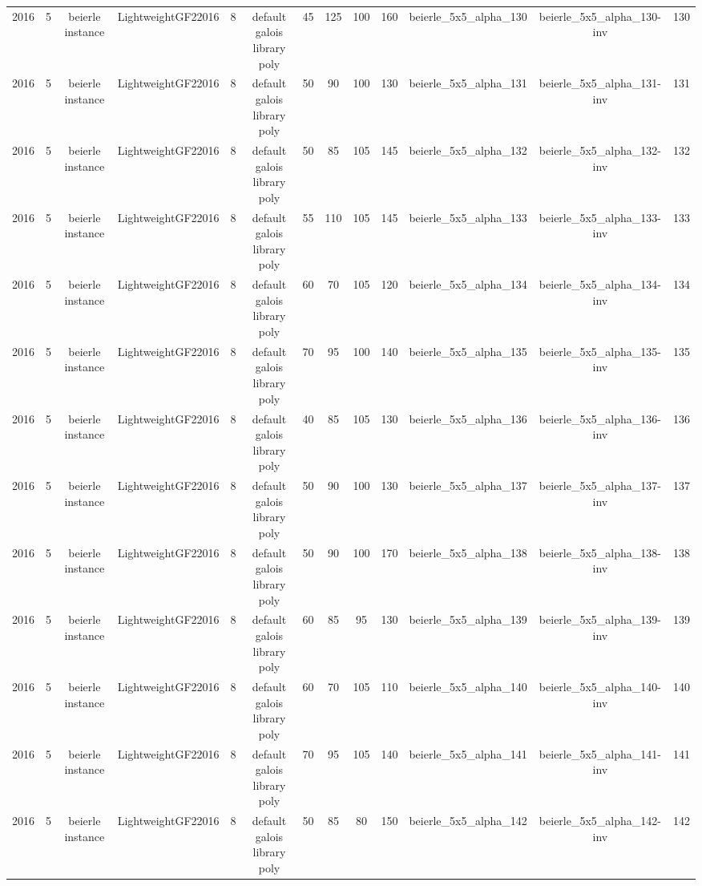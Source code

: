 \begin{tabular}{c c c c c c c c c c c c c}
2016 & 5 & beierle instance & LightweightGF22016 & 8 & default galois library poly & 45 & 125 & 100 & 160 & beierle_5x5_alpha_130 & beierle_5x5_alpha_130-inv & 130 \\
2016 & 5 & beierle instance & LightweightGF22016 & 8 & default galois library poly & 50 & 90 & 100 & 130 & beierle_5x5_alpha_131 & beierle_5x5_alpha_131-inv & 131 \\
2016 & 5 & beierle instance & LightweightGF22016 & 8 & default galois library poly & 50 & 85 & 105 & 145 & beierle_5x5_alpha_132 & beierle_5x5_alpha_132-inv & 132 \\
2016 & 5 & beierle instance & LightweightGF22016 & 8 & default galois library poly & 55 & 110 & 105 & 145 & beierle_5x5_alpha_133 & beierle_5x5_alpha_133-inv & 133 \\
2016 & 5 & beierle instance & LightweightGF22016 & 8 & default galois library poly & 60 & 70 & 105 & 120 & beierle_5x5_alpha_134 & beierle_5x5_alpha_134-inv & 134 \\
2016 & 5 & beierle instance & LightweightGF22016 & 8 & default galois library poly & 70 & 95 & 100 & 140 & beierle_5x5_alpha_135 & beierle_5x5_alpha_135-inv & 135 \\
2016 & 5 & beierle instance & LightweightGF22016 & 8 & default galois library poly & 40 & 85 & 105 & 130 & beierle_5x5_alpha_136 & beierle_5x5_alpha_136-inv & 136 \\
2016 & 5 & beierle instance & LightweightGF22016 & 8 & default galois library poly & 50 & 90 & 100 & 130 & beierle_5x5_alpha_137 & beierle_5x5_alpha_137-inv & 137 \\
2016 & 5 & beierle instance & LightweightGF22016 & 8 & default galois library poly & 50 & 90 & 100 & 170 & beierle_5x5_alpha_138 & beierle_5x5_alpha_138-inv & 138 \\
2016 & 5 & beierle instance & LightweightGF22016 & 8 & default galois library poly & 60 & 85 & 95 & 130 & beierle_5x5_alpha_139 & beierle_5x5_alpha_139-inv & 139 \\
2016 & 5 & beierle instance & LightweightGF22016 & 8 & default galois library poly & 60 & 70 & 105 & 110 & beierle_5x5_alpha_140 & beierle_5x5_alpha_140-inv & 140 \\
2016 & 5 & beierle instance & LightweightGF22016 & 8 & default galois library poly & 70 & 95 & 105 & 140 & beierle_5x5_alpha_141 & beierle_5x5_alpha_141-inv & 141 \\
2016 & 5 & beierle instance & LightweightGF22016 & 8 & default galois library poly & 50 & 85 & 80 & 150 & beierle_5x5_alpha_142 & beierle_5x5_alpha_142-inv & 142 \\

\end{tabular}

